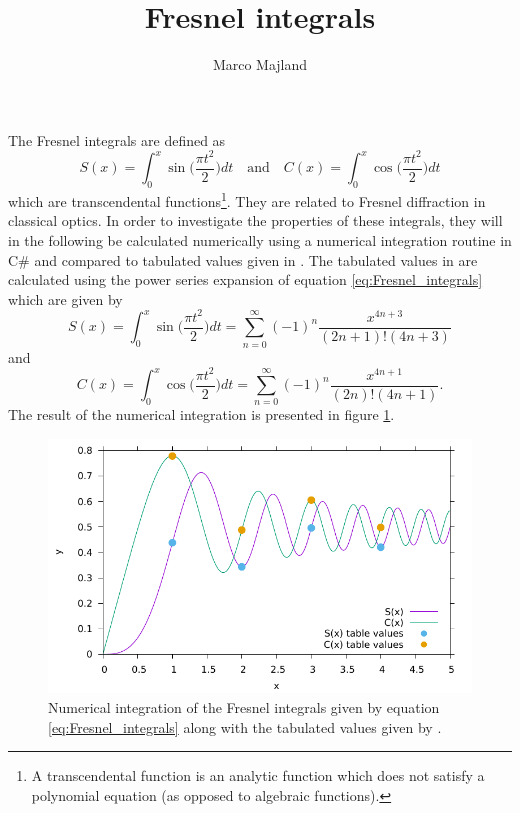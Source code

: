 \documentclass{article}
\title{Fresnel integrals}
\author{Marco Majland}
\begin{document}
	\maketitle
	\noindent
	The Fresnel integrals are defined as
	\begin{equation}
		S(x) = \int_{0}^{x}\sin\Big(\frac{\pi t^2}{2}\Big)dt\quad\textrm{and}\quad C(x) = \int_{0}^{x}\cos\Big(\frac{\pi t^2}{2}\Big)dt
		\label{eq:Fresnel_integrals}
	\end{equation}
	which are transcendental functions\footnote{A transcendental function is an analytic function which does not satisfy a polynomial equation (as opposed to algebraic functions).}. They are related to Fresnel diffraction in classical optics. In order to investigate the properties of these integrals, they will in the following be calculated numerically using a numerical integration routine in C\# and compared to tabulated values given in \cite{ref1}. The tabulated values in \cite{ref1} are calculated using the power series expansion of equation \ref{eq:Fresnel_integrals} which are given by
	\begin{equation}
		S(x) = \int_{0}^{x}\sin\Big(\frac{\pi t^2}{2}\Big)dt = \sum_{n = 0}^{\infty}(-1)^{n}\frac{x^{4n+3}}{(2n+1)!(4n+3)}
	\end{equation}
	and
	\begin{equation}
	C(x) = \int_{0}^{x}\cos\Big(\frac{\pi t^2}{2}\Big)dt = \sum_{n = 0}^{\infty}(-1)^{n}\frac{x^{4n+1}}{(2n)!(4n+1)}.
	\end{equation}
	The result of the numerical integration is presented in figure \ref{fig:integration}.
	\begin{figure}
	\includegraphics[]{Output.pdf}
	\caption{Numerical integration of the Fresnel integrals given by equation \ref{eq:Fresnel_integrals} along with the tabulated values given by \cite{ref1}.}
	\label{fig:integration}
	\end{figure}
\end{document}
